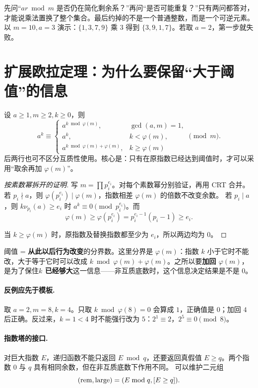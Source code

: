 \begin{teach}[证明中的两个关卡]
先问“$ar\bmod m$ 是否仍在简化剩余系？”再问“是否可能重复？”只有两问都答对，才能说乘法置换了整个集合。最后约掉的不是一个普通整数，而是一个可逆元素。
以 $m=10,a=3$ 演示：$\{1,3,7,9\}$ 乘 $3$ 得到 $\{3,9,1,7\}$。若取 $a=2$，第一步就失败。
\end{teach}


\section{扩展欧拉定理：为什么要保留“大于阈值”的信息}
设 $a\ge1,m\ge2,k\ge0$，则
\[
 a^k\equiv
 \begin{cases}
 a^{k\bmod\varphi(m)},&\gcd(a,m)=1,\\
 a^k,&k<\varphi(m),\\
 a^{k\bmod\varphi(m)+\varphi(m)},&k\ge\varphi(m)
 \end{cases}\pmod m.
\]
后两行也可不区分互质性使用。核心是：只有在原指数已经达到阈值时，才可以采用“取余再加 $\varphi(m)$”。


\begin{proof}[按素数幂拆开的证明]
写 $m=\prod p_i^{e_i}$。对每个素数幂分别验证，再用 CRT 合并。
若 $p_i\nmid a$，则 $\varphi(p_i^{e_i})\mid\varphi(m)$，指数相差 $\varphi(m)$ 的倍数不改变余数。
若 $p_i\mid a$，则 $k\nu_{p_i}(a)\ge e_i$ 时 $a^k\equiv0\pmod{p_i^{e_i}}$。而
\[
\varphi(m)\ge\varphi(p_i^{e_i})=p_i^{e_i-1}(p_i-1)\ge e_i.
\]


当 $k\ge\varphi(m)$ 时，原指数及替换指数都至少为 $e_i$，所以两边均为 $0$。
\end{proof}

\begin{tip}[阈值这个词]
阈值 = \textbf{从此以后行为改变}的分界数。这里分界是 $\varphi(m)$：指数 $k$ 小于它时不能改，大于等于它时可以改成 $k\bmod\varphi(m)+\varphi(m)$。之所以要\textbf{加回 $\varphi(m)$}，是为了保住\textbf{$k$ 已经够大}这一信息——非互质底数时，这个信息决定结果是不是 $0$。
\end{tip}


\paragraph{反例应先于模板.} 取 $a=2,m=8,k=4$。只取 $k\bmod\varphi(8)=0$ 会算成 $1$，正确值是 $0$；加回 $4$ 后正确。反过来，$k=1<4$ 时不能强行改为 $5$：$2^1\equiv2$，$2^5\equiv0\pmod8$。

\paragraph{指数塔的接口.} 对巨大指数 $E$，递归函数不能只返回 $E\bmod q$，还要返回真假值 $E\ge q$。两个指数 $0$ 与 $q$ 具有相同余数，但在非互质底数下作用不同。
可以维护二元组
\[
 (\operatorname{rem},\operatorname{large})=(E\bmod q,\left[E\ge q\right]).
\]

